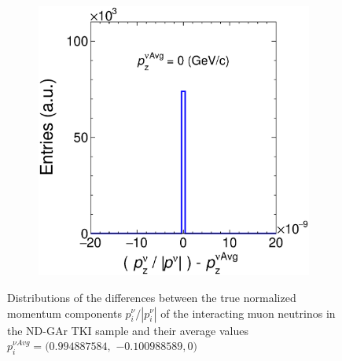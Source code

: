 \begin{figure}[t]
\begin{subfigure}[b]{0.32\textwidth}
         \caption{}
        \label{fig:NupyNorm}
     \end{subfigure}
     \begin{subfigure}[b]{0.32\textwidth}
         \centering
         \includegraphics[width=\textwidth]{figures/ch6-TKI/Properties/NupzNorm.eps}
         \caption{}
         \label{fig:NupzNorm.eps}
     \end{subfigure}
        \caption{Distributions of the differences between the true normalized momentum components $p^\nu_i/|p^\nu_i|$ of the interacting muon neutrinos in the ND-GAr TKI sample and their average values $p^{\nu Avg}_i= (0.994887584,$ $ -0.100988589 , 0)$} \label{fig:NupNorm}
\end{figure}

